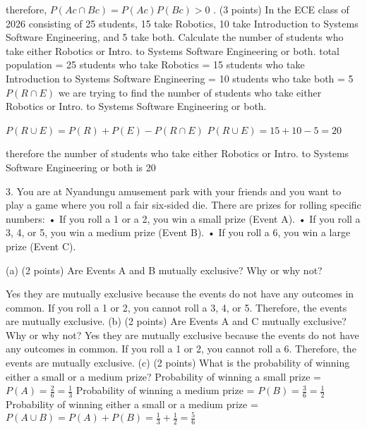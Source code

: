 \documentclass{article}
\begin{document}
therefore, \(P(Ac \cap Bc) = P(Ac)P(Bc) > 0\)   \newline {}. (3 points) In the ECE class of 2026 consisting of 25 students, 15 take Robotics, 10 take Introduction
to Systems Software Engineering, and 5 take both. Calculate the number of students who
take either Robotics or Intro. to Systems Software Engineering or both.\newline\newline
total population = 25\newline
students who take Robotics = 15\newline
students who take Introduction to Systems Software Engineering = 10\newline
students who take both = 5 \(P(R \cap E)\)\newline
we are trying to find the number of students who take either Robotics or Intro. to Systems Software Engineering or both.\newline

\(P(R \cup E ) = P(R) + P(E) - P(R \cap E)\)\newline
\(P(R \cup E ) = 15 + 10 - 5 = 20\)\newline

therefore the number of students who take either Robotics or Intro. to Systems Software Engineering or both is 20\newline

3. You are at Nyandungu amusement park with your friends and you want to play a game where you
roll a fair six-sided die. There are prizes for rolling specific numbers:\newline
• If you roll a 1 or a 2, you win a small prize (Event A).\newline
• If you roll a 3, 4, or 5, you win a medium prize (Event B).\newline
• If you roll a 6, you win a large prize (Event C).\newline

(a) (2 points) Are Events A and B mutually exclusive? Why or why not?

Yes they are mutually exclusive because the events do not have any outcomes in common. If you roll a 1 or 2, you cannot roll a 3, 4, or 5. Therefore, the events are mutually exclusive.\newline
(b) (2 points) Are Events A and C mutually exclusive? Why or why not?
Yes they are mutually exclusive because the events do not have any outcomes in common. If you roll a 1 or 2, you cannot roll a 6. Therefore, the events are mutually exclusive.\newline
(c) (2 points) What is the probability of winning either a small or a medium prize?
Probability of winning a small prize = \(P(A) = \frac{2}{6} = \frac{1}{3}\)\newline
Probability of winning a medium prize = \(P(B) = \frac{3}{6} = \frac{1}{2}\)\newline
Probability of winning either a small or a medium prize = \(P(A \cup B) = P(A) + P(B) = \frac{1}{3} + \frac{1}{2} = \frac{5}{6}\)\newline
\end{document}
